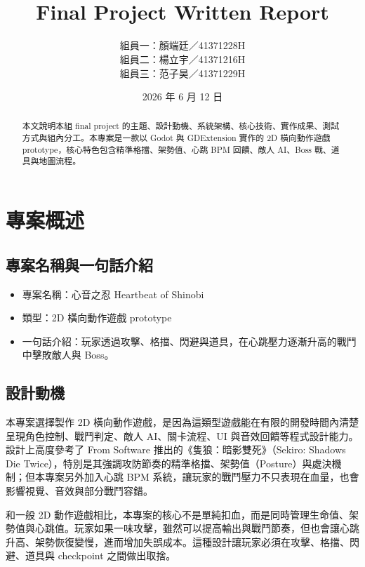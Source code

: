 \documentclass[12pt,a4paper]{article}
\title{
  \vspace{-1.5cm}
  \textbf{\projecttitle}\\
  \large Final Project Written Report
}
\author{
  組員一：顏端廷／41371228H \\
  組員二：楊立宇／41371216H \\
  組員三：范子昊／41371229H
}
\date{2026 年 6 月 12 日}
\newcommand{\projecttitle}{心音之忍 Heartbeat of Shinobi}
\begin{document}
\maketitle

\begin{abstract}
本文說明本組 final project 的主題、設計動機、系統架構、核心技術、實作成果、測試方式與組內分工。本專案是一款以 Godot 與 GDExtension 實作的 2D 橫向動作遊戲 prototype，核心特色包含精準格擋、架勢值、心跳 BPM 回饋、敵人 AI、Boss 戰、道具與地圖流程。
\end{abstract}

\tableofcontents
\newpage

\section{專案概述}

\subsection{專案名稱與一句話介紹}
\begin{itemize}[leftmargin=2em]
  \item 專案名稱：\projecttitle
  \item 類型：2D 橫向動作遊戲 prototype
  \item 一句話介紹：玩家透過攻擊、格擋、閃避與道具，在心跳壓力逐漸升高的戰鬥中擊敗敵人與 Boss。
\end{itemize}

\subsection{設計動機}
本專案選擇製作 2D 橫向動作遊戲，是因為這類型遊戲能在有限的開發時間內清楚呈現角色控制、戰鬥判定、敵人 AI、關卡流程、UI 與音效回饋等程式設計能力。設計上高度參考了 From Software 推出的《隻狼：暗影雙死》（Sekiro: Shadows Die Twice），特別是其強調攻防節奏的精準格擋、架勢值（Posture）與處決機制；但本專案另外加入心跳 BPM 系統，讓玩家的戰鬥壓力不只表現在血量，也會影響視覺、音效與部分戰鬥容錯。

和一般 2D 動作遊戲相比，本專案的核心不是單純扣血，而是同時管理生命值、架勢值與心跳值。玩家如果一味攻擊，雖然可以提高輸出與戰鬥節奏，但也會讓心跳升高、架勢恢復變慢，進而增加失誤成本。這種設計讓玩家必須在攻擊、格擋、閃避、道具與 checkpoint 之間做出取捨。
\end{document}
